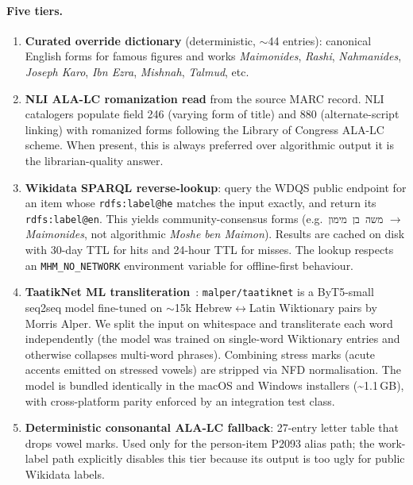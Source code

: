 \documentclass[Afour,sageh,times]{sagej}
\newcommand{\code}[1]{\texttt{#1}}
\begin{document}
\paragraph{Five tiers.}
\begin{enumerate}
\item \textbf{Curated override dictionary} (deterministic, $\sim$44 entries): canonical English forms for famous figures and works \textemdash{} \textit{Maimonides}, \textit{Rashi}, \textit{Nahmanides}, \textit{Joseph Karo}, \textit{Ibn Ezra}, \textit{Mishnah}, \textit{Talmud}, etc.

\item \textbf{NLI ALA-LC romanization read} from the source MARC record. NLI catalogers populate field 246 (varying form of title) and 880 (alternate-script linking) with romanized forms following the Library of Congress ALA-LC scheme. When present, this is always preferred over algorithmic output \textemdash{} it is the librarian-quality answer.

\item \textbf{Wikidata SPARQL reverse-lookup}: query the WDQS public endpoint for an item whose \texttt{rdfs:label@he} matches the input exactly, and return its \texttt{rdfs:label@en}. This yields community-consensus forms (e.g.~\code{משה בן מימון} $\to$ \textit{Maimonides}, not algorithmic \textit{Moshe ben Maimon}). Results are cached on disk with 30-day TTL for hits and 24-hour TTL for misses. The lookup respects an \texttt{MHM\_NO\_NETWORK} environment variable for offline-first behaviour.

\item \textbf{TaatikNet ML transliteration}~\cite{taatiknet}: \texttt{malper/taatiknet} is a ByT5-small seq2seq model fine-tuned on $\sim$15k Hebrew$\leftrightarrow$Latin Wiktionary pairs by Morris Alper. We split the input on whitespace and transliterate each word independently (the model was trained on single-word Wiktionary entries and otherwise collapses multi-word phrases). Combining stress marks (acute accents emitted on stressed vowels) are stripped via NFD normalisation. The model is bundled identically in the macOS and Windows installers (\textasciitilde 1.1\,GB), with cross-platform parity enforced by an integration test class.

\item \textbf{Deterministic consonantal ALA-LC fallback}: 27-entry letter table that drops vowel marks. Used only for the person-item P2093 alias path; the work-label path explicitly disables this tier because its output is too ugly for public Wikidata labels.
\end{enumerate}
\end{document}
